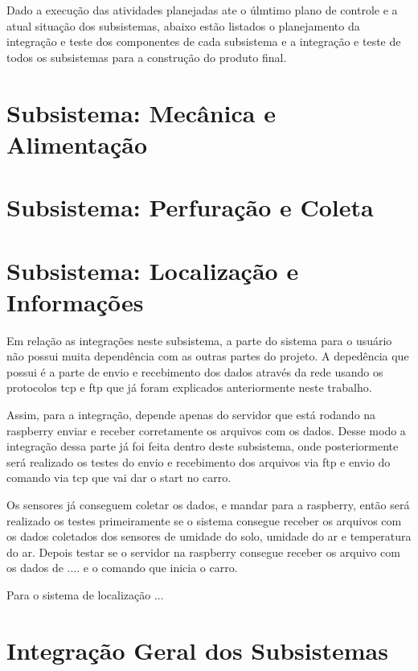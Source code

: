 Dado a execução das atividades planejadas ate o úlmtimo plano de controle e a atual situação dos subsistemas, abaixo estão listados o planejamento da integração e teste dos componentes de cada subsistema e a integração e teste de todos os subsistemas para a construção do produto final.

\section{Subsistema: Mecânica e Alimentação}

\section{Subsistema: Perfuração e Coleta}

\section{Subsistema: Localização e Informações}

Em relação as integrações neste subsistema, a parte do sistema para o usuário não possui muita dependência com as outras partes do projeto. A depedência que possui é a parte de envio e recebimento dos dados através da rede usando os protocolos tcp e ftp que já foram explicados anteriormente neste trabalho.

Assim, para a integração, depende apenas do servidor que está rodando na raspberry enviar e receber corretamente os arquivos com os dados. Desse modo a integração dessa parte já foi feita dentro deste subsistema, onde posteriormente será realizado os testes do envio e recebimento dos arquivos via ftp e envio do comando via tcp que vai dar o start no carro.

Os sensores já conseguem coletar os dados, e mandar para a raspberry, então será realizado os testes primeiramente se o sistema consegue receber os arquivos com os dados coletados dos sensores de umidade do solo, umidade do ar e temperatura do ar. Depois testar se o servidor na raspberry consegue receber os arquivo com os dados de .... e o comando que inicia o carro.

Para o sistema de localização ...

\section{Integração Geral dos Subsistemas}


